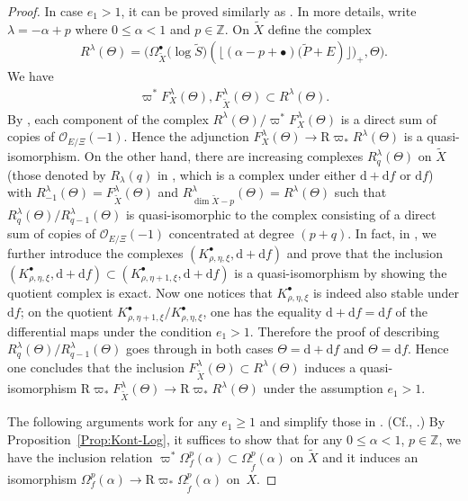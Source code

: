 \documentclass[pdftex]{sigma}
\newcommand{\ZZ}{\mathbb{Z}}
\newcommand{\sO}{\mathscr{O}}
\newcommand{\de}{\mathrm{d}}
\newcommand{\ddRH}{\Theta}
\newcommand{\flr}[1]{\lfloor #1 \rfloor}
\newcommand{\RD}{\mathrm{R}}
\begin{document}
\begin{proof}
In case $e_1 >1$, it can be proved similarly as \cite[Proposition~4.4]{Y}. In more details, write $\lambda = -\alpha+p$ where $0\leq\alpha <1$ and $p\in\ZZ$. On $\widetilde{X}$ define the complex
\begin{gather*} R^\lambda(\ddRH) = \big(\Omega_{\widetilde{X}}^\bullet\big(\log \widetilde{S}\big)(\flr{(\alpha -p+\bullet )\big(\widetilde{P}+E)}\big)_+, \ddRH \big). \end{gather*}
We have
\begin{gather*} \varpi^*F_X^\lambda(\ddRH), F_{\widetilde{X}}^\lambda(\ddRH) \subset R^\lambda(\ddRH). \end{gather*}
By \cite[Proposition~4.4(i)]{Y}, each component of the complex $R^\lambda(\ddRH)/\varpi^*F_X^\lambda(\ddRH)$ is a direct sum of copies of $\sO_{E/\Xi}(-1)$. Hence the adjunction $F_X^\lambda(\ddRH) \to \RD\varpi_*R^\lambda(\ddRH)$ is a quasi-isomorphism. On the other hand, there are increasing complexes $R^\lambda_q(\ddRH)$ on $\widetilde{X}$ (those denoted by $R_\lambda(q)$ in \cite[equation~(27)]{Y}, which is a complex under either $\de +\de f$ or $\de f$) with $R^\lambda_{-1}(\ddRH) = F^\lambda_{\widetilde{X}}(\ddRH)$ and $R^\lambda_{\dim \widetilde{X} -p}(\ddRH) = R^\lambda(\ddRH)$ such that $R^\lambda_q(\ddRH)/R^\lambda_{q-1}(\ddRH)$
is quasi-isomorphic to the complex consisting of a direct sum of copies of $\sO_{E/\Xi}(-1)$ concentrated at degree $(p+q)$. In fact, in \cite[Lemma~4.5]{Y}, we further introduce the complexes $(K_{\rho,\eta,\xi}^\bullet, \de +\de f)$ and prove that the inclusion $(K_{\rho,\eta,\xi}^\bullet, \de +\de f) \subset (K_{\rho,\eta+1,\xi}^\bullet, \de +\de f)$ is a quasi-isomorphism by showing the quotient complex is exact. Now
one notices that $K_{\rho,\eta,\xi}^\bullet$ is indeed also stable under $\de f$; on the quotient $K_{\rho,\eta+1,\xi}^\bullet/K_{\rho,\eta,\xi}^\bullet$, one has the equality $\de +\de f = \de f$ of the differential maps
under the condition $e_1>1$. Therefore the proof of \cite[Proposition~4.4(ii)]{Y} describing $R^\lambda_q(\ddRH)/R^\lambda_{q-1}(\ddRH)$ goes through in both cases $\ddRH = \de +\de f$ and $\ddRH = \de f$. Hence one concludes that the inclusion $F_{\widetilde{X}}^\lambda(\ddRH) \subset R^\lambda(\ddRH)$ induces a quasi-isomorphism $\RD\varpi_*F_{\widetilde{X}}^\lambda(\ddRH) \to \RD\varpi_*R^\lambda(\ddRH)$ under the assumption $e_1>1$.

The following arguments work for any $e_1\geq 1$ and simplify those in \cite[Section~4($b$)]{Y}. (Cf., \cite[Lemma 2.12(b)]{KKP}.) By Proposition~\ref{Prop:Kont-Log}, it suffices to show that for any $0\leq\alpha <1$, $p\in\ZZ$, we have the inclusion relation $\varpi^*\Omega_f^p(\alpha) \subset \Omega_{\tilde{f}}^p(\alpha)$ on $\widetilde{X}$ and it induces an isomorphism $\Omega_f^p(\alpha) \to \RD\varpi_*\Omega_{\tilde{f}}^p(\alpha)$ on~$X$.


\end{proof}
\end{document}

